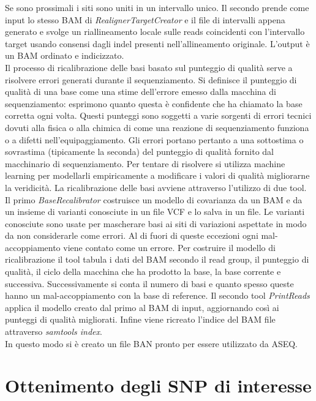     Se sono prossimali i siti sono uniti in un intervallo unico.
    Il secondo prende come input lo stesso BAM di \emph{RealignerTargetCreator} e il file di intervalli appena generato e svolge un riallineamento locale sulle reads coincidenti con l'intervallo target usando consensi dagli indel presenti nell'allineamento originale.
    L'output \`e un BAM ordinato e indicizzato.\\
    Il processo di ricalibrazione delle basi basato sul punteggio di qualit\`a serve a risolvere errori generati durante il sequenziamento.
    Si definisce il punteggio di qualit\`a di una base come una stime dell'errore emesso dalla macchina di sequenziamento: esprimono quanto questa \`e confidente che ha chiamato la base corretta ogni volta.
    Questi punteggi sono soggetti a varie sorgenti di errori tecnici dovuti alla fisica o alla chimica di come una reazione di sequenziamento funziona o a difetti nell'equipaggiamento.
    Gli errori portano pertanto a una sottostima o sovrastima (tipicamente la seconda) del punteggio di qualit\`a fornito dal macchinario di sequenziamento.
    Per tentare di risolvere si utilizza machine learning per modellarli empiricamente a modificare i valori di qualit\`a migliorarne la veridicit\`a.
    La ricalibrazione delle basi avviene attraverso l'utilizzo di due tool.
    Il primo \emph{BaseRecalibrator} costruisce un modello di covarianza da un BAM e da un insieme di varianti conosciute in un file VCF e lo salva in un file.
    Le varianti conosciute sono usate per mascherare basi ai siti di variazioni aspettate in modo da non considerarle come errori.
    Al di fuori di queste eccezioni ogni mal-accoppiamento viene contato come un errore.
    Per costruire il modello di ricalibrazione il tool tabula i dati del BAM secondo il read group, il punteggio di qualit\`a, il ciclo della macchina che ha prodotto la base, la base corrente e successiva.
    Successivamente si conta il numero di basi e quanto spesso queste hanno un mal-accoppiamento con la base di reference.
    Il secondo tool \emph{PrintReads} applica il modello creato dal primo al BAM di input, aggiornando cos\`i ai punteggi di qualit\`a migliorati.
    Infine viene ricreato l'indice del BAM file attraverso \emph{samtools index}.\\
    In questo modo si \`e creato un file BAN pronto per essere utilizzato da ASEQ.

  \section{Ottenimento degli SNP di interesse}
